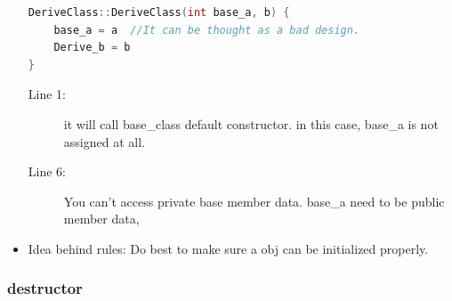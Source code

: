 \documentclass[a4paper,11pt,twoside]{book}
\begin{document}
\begin{itemize}
\begin{lstlisting}[frame=single, language=c++]
DeriveClass::DeriveClass(int base_a, b) {
	base_a = a  //It can be thought as a bad design.
	Derive_b = b
}
\end{lstlisting}
\begin{description}
	\item[Line 1:] it will call base\_class default constructor. in this case, base\_a is not assigned at all.
	\item[Line 6:] You can't  access private base member data. base\_a need to be public member data,
\end{description}
	\item Idea behind rules: Do best to make sure a obj can be initialized properly.	
\end{itemize}


\subsubsection{destructor}
\end{document}
